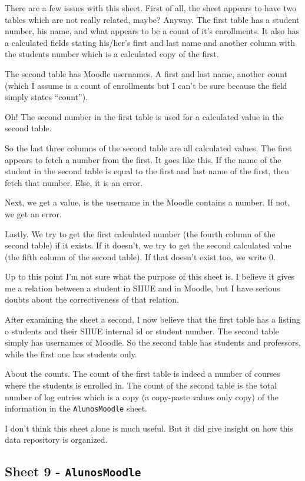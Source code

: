 There are a few issues with this sheet. First of all, the sheet appears to have
two tables which are not really related, maybe? Anyway. The first table has a
student number, his name, and what appears to be a count of it's enrollments.
It also has a calculated fields stating his/her's first and last name and
another column with the students number which is a calculated copy of the
first.

The second table has Moodle usernames. A first and last name, another count
(which I assume is a count of enrollments but I can't be sure because the field
simply states ``count'').

Oh! The second number in the first table is used for a calculated value in the
second table.

So the last three columns of the second table are all calculated values. The
first appears to fetch a number from the first. It goes like this. If the name
of the student in the second table is equal to the first and last name of the
first, then fetch that number. Else, it is an error.

Next, we get a value, is the username in the Moodle contains a number. If not,
we get an error.

Lastly. We try to get the first calculated number (the fourth column of the
second table) if it exists. If it doesn't, we try to get the second calculated
value (the fifth column of the second table). If that doesn't exist too, we
write 0.

Up to this point I'm not sure what the purpose of this sheet is. I believe it
gives me a relation between a student in SIIUE and in Moodle, but I have
serious doubts about the correctiveness of that relation.

After examining the sheet a second, I now believe that the first table has a
listing o students and their SIIUE internal id or student number. The second
table simply has usernames of Moodle. So the second table has students and
professors, while the first one has students only.

About the counts. The count of the first table is indeed a number of courses
where the students is enrolled in. The count of the second table is the total
number of log entries which is a copy (a copy-paste values only copy) of the
information in the \texttt{AlunosMoodle} sheet.

I don't think this sheet alone is much useful. But it did give insight on how
this data repository is organized.

\subsection{Sheet 9 - \texttt{AlunosMoodle}}

